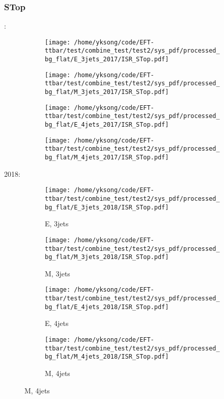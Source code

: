 \documentclass{beamer}
\begin{document}
\begin{frame}
\frametitle{STop}
\fontsize{5}{1}:
\begin{figure}
\centering
\begin{subfigure}[b]{0.24\textwidth}
\texttt{[image: /home/yksong/code/EFT-ttbar/test/combine\_test/test2/sys\_pdf/processed\_bg\_flat/E\_3jets\_2017/ISR\_STop.pdf]}
\end{subfigure}
\begin{subfigure}[b]{0.24\textwidth}
\texttt{[image: /home/yksong/code/EFT-ttbar/test/combine\_test/test2/sys\_pdf/processed\_bg\_flat/M\_3jets\_2017/ISR\_STop.pdf]}
\end{subfigure}
\begin{subfigure}[b]{0.24\textwidth}
\texttt{[image: /home/yksong/code/EFT-ttbar/test/combine\_test/test2/sys\_pdf/processed\_bg\_flat/E\_4jets\_2017/ISR\_STop.pdf]}
\end{subfigure}
\begin{subfigure}[b]{0.24\textwidth}
\texttt{[image: /home/yksong/code/EFT-ttbar/test/combine\_test/test2/sys\_pdf/processed\_bg\_flat/M\_4jets\_2017/ISR\_STop.pdf]}
\end{subfigure}
\end{figure}
2018:
\begin{figure}
\centering
\begin{subfigure}[b]{0.24\textwidth}
\texttt{[image: /home/yksong/code/EFT-ttbar/test/combine\_test/test2/sys\_pdf/processed\_bg\_flat/E\_3jets\_2018/ISR\_STop.pdf]}
\captionsetup{font=tiny}
\caption{E, 3jets}
\end{subfigure}
\begin{subfigure}[b]{0.24\textwidth}
\texttt{[image: /home/yksong/code/EFT-ttbar/test/combine\_test/test2/sys\_pdf/processed\_bg\_flat/M\_3jets\_2018/ISR\_STop.pdf]}
\captionsetup{font=tiny}
\caption{M, 3jets}
\end{subfigure}
\begin{subfigure}[b]{0.24\textwidth}
\texttt{[image: /home/yksong/code/EFT-ttbar/test/combine\_test/test2/sys\_pdf/processed\_bg\_flat/E\_4jets\_2018/ISR\_STop.pdf]}
\captionsetup{font=tiny}
\caption{E, 4jets}
\end{subfigure}
\begin{subfigure}[b]{0.24\textwidth}
\texttt{[image: /home/yksong/code/EFT-ttbar/test/combine\_test/test2/sys\_pdf/processed\_bg\_flat/M\_4jets\_2018/ISR\_STop.pdf]}
\captionsetup{font=tiny}
\caption{M, 4jets}
\end{subfigure}
\end{figure}
\end{frame}
\end{document}
